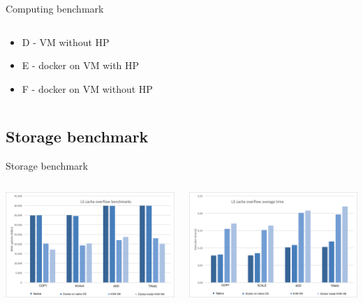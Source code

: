 \begin{frame}{Computing benchmark}
\begin{columns}
\begin{column}{0.5\textwidth}
\begin{figure}
			\end{figure}
			\begin{itemize}
				\item[]{\scriptsize{D - VM without HP}}
				\item[]{\scriptsize{E - docker on VM with HP}}
				\item[]{\scriptsize{F - docker on VM without HP}}
			\end{itemize}
		\end{column}
	\end{columns}
\end{frame}

\subsection{Storage benchmark}
\begin{frame}{Storage benchmark}
	\begin{columns}
		\begin{column}{0.5\textwidth}
			\centering{}
			\includegraphics[scale=0.14]{images/storage-l3-capacity.png}
		\end{column}
		\begin{column}{0.5\textwidth}
			\centering{}
			\includegraphics[scale=0.14]{images/storage-l3-time.png}
		\end{column}
	\end{columns}
\end{frame}


